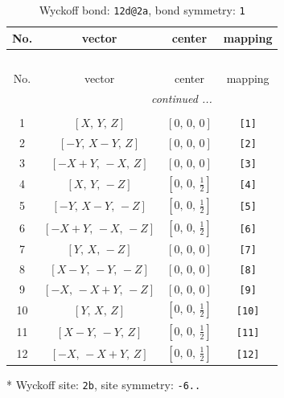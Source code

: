\documentclass[fleqn,8pt]{jsarticle}
\begin{document}
\begin{longtable}{cccc}
\caption{Wyckoff bond: {\tt 12d@2a}, bond symmetry: {\tt 1}}
 \\
 \hline \hline
No. & vector & center & mapping \\ \hline \endfirsthead

\multicolumn{3}{l}{\tablename\ \thetable{}} \\
 \hline \hline
No. & vector & center & mapping \\ \hline \endhead

 \hline \hline
\multicolumn{3}{r}{\footnotesize\it continued ...} \\ \endfoot

 \hline \hline
\multicolumn{3}{r}{} \\ \endlastfoot

1 & $\left[ X,\, Y,\, Z \right]$ & $\left[ 0,\, 0,\, 0 \right]$ & {\tt [1]} \\ \hline
2 & $\left[ - Y,\, X - Y,\, Z \right]$ & $\left[ 0,\, 0,\, 0 \right]$ & {\tt [2]} \\ \hline
3 & $\left[ - X + Y,\, - X,\, Z \right]$ & $\left[ 0,\, 0,\, 0 \right]$ & {\tt [3]} \\ \hline
4 & $\left[ X,\, Y,\, - Z \right]$ & $\left[ 0,\, 0,\, \frac{1}{2} \right]$ & {\tt [4]} \\ \hline
5 & $\left[ - Y,\, X - Y,\, - Z \right]$ & $\left[ 0,\, 0,\, \frac{1}{2} \right]$ & {\tt [5]} \\ \hline
6 & $\left[ - X + Y,\, - X,\, - Z \right]$ & $\left[ 0,\, 0,\, \frac{1}{2} \right]$ & {\tt [6]} \\ \hline
7 & $\left[ Y,\, X,\, - Z \right]$ & $\left[ 0,\, 0,\, 0 \right]$ & {\tt [7]} \\ \hline
8 & $\left[ X - Y,\, - Y,\, - Z \right]$ & $\left[ 0,\, 0,\, 0 \right]$ & {\tt [8]} \\ \hline
9 & $\left[ - X,\, - X + Y,\, - Z \right]$ & $\left[ 0,\, 0,\, 0 \right]$ & {\tt [9]} \\ \hline
10 & $\left[ Y,\, X,\, Z \right]$ & $\left[ 0,\, 0,\, \frac{1}{2} \right]$ & {\tt [10]} \\ \hline
11 & $\left[ X - Y,\, - Y,\, Z \right]$ & $\left[ 0,\, 0,\, \frac{1}{2} \right]$ & {\tt [11]} \\ \hline
12 & $\left[ - X,\, - X + Y,\, Z \right]$ & $\left[ 0,\, 0,\, \frac{1}{2} \right]$ & {\tt [12]} \\
\end{longtable}
* Wyckoff site: {\tt 2b}, site symmetry: {\tt -6..}
\renewcommand{\arraystretch}{1.2}
\end{document}
